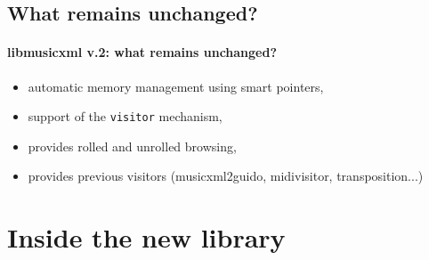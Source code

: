 \documentclass{beamer}
\begin{document}
\section{What remains unchanged?}
\begin{frame}
	\frametitle{libmusicxml v.2: what remains unchanged?}
	
\begin{itemize}
		\item automatic memory management using smart pointers,
		\item support of the \texttt{visitor} mechanism,
		\item provides rolled and unrolled browsing,
		\item provides previous visitors (musicxml2guido, midivisitor, transposition...)
	\end{itemize}
\end{frame}


\chapter{Inside the new library}
\end{document}
